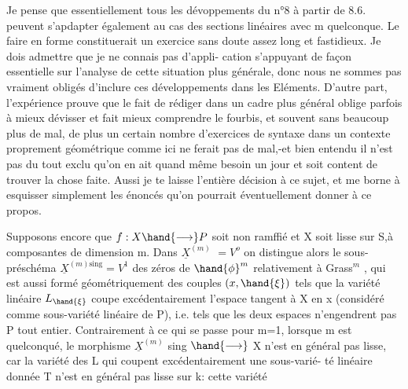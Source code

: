 




Je pense que essentiellement tous les dévoppements du n°8 à
partir de 8.6. peuvent s'apdapter également au cas des sections linéaires avec
m quelconque. Le faire en forme constituerait un exercice sans doute
assez long et fastidieux. Je dois admettre que je ne connais pas d'appli-%
cation s'appuyant de façon essentielle sur l'analyse de cette situation
plus générale, donc nous ne sommes pas vraiment obligés d'inclure ces
développements dans les Eléments. D'autre part, l'expérience prouve que
le fait de rédiger dans un cadre plus général oblige parfois à mieux
dévisser et fait mieux comprendre le fourbis, et souvent sans beaucoup
plus de mal, de plus un certain nombre d'exercices de syntaxe dans un
contexte proprement géométrique comme ici ne ferait pas de mal,-et
bien entendu il n'est pas du tout exclu qu'on en ait quand même besoin
un jour et soit content de trouver la chose faite. Aussi je te laisse
l'entière décision à ce sujet, et me borne à esquisser simplement les
énoncés qu'on pourrait éventuellement donner à ce propos.

Supposons encore que $f:X \hand{\longrightarrow} P$ soit non ramffié et X soit lisse sur
S,à composantes de dimension \hand{$\geq$} m. %
Dans $\underline{X}^{(m)}$ $=V^o$ on distingue alors le sous-préschéma $\underline{X}^{(m)\mathrm{sing}} = V^1$
des zéros  de $\hand{\phi}^m$ relativement à Grass$^m$ , qui est aussi formé
géométriquement des couples $(x,\hand{\xi})$ tels que la variété linéaire $L_{\hand{\xi}}$
coupe excédentairement l'espace tangent à X en x (considéré comme
sous-variété linéaire de P), i.e. tels que les deux espaces n'engendrent
pas P tout entier. Contrairement à ce qui se passe pour m=1, lorsque
m est quelconqué, le morphisme $\underline{X}^{(m)}$ sing $\hand{\longrightarrow}$ X n'est en général pas
lisse, car la variété des L qui  %
coupent excédentairement une sous-varié-%
té linéaire donnée T n'est en général pas lisse sur k: cette variété


